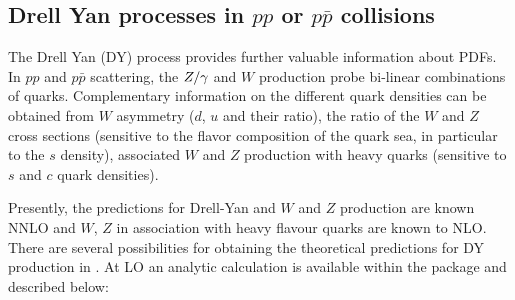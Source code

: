 \subsection{Drell Yan processes  in $pp$ or $p\bar p$ collisions}
\label{dysection}

The Drell Yan (DY) process
provides further valuable information about PDFs.
In $pp$ and $p\bar p$ scattering, the $Z/\gamma\*$ and $W$ production 
probe bi-linear combinations of quarks. 
Complementary information on the different quark densities
can be obtained from $W$ asymmetry ($d$, $u$ and their ratio),
the ratio of the $W$ and $Z$ cross sections (sensitive to the flavor 
composition of the quark sea, in particular to the $s$ density), 
associated $W$ and $Z$ production with
heavy quarks (sensitive to $s$ and $c$ quark densities).
%

Presently, the predictions for Drell-Yan and $W$ and $Z$ production are known 
NNLO and $W$, $Z$ in association with heavy flavour quarks are known to NLO. There are several possibilities 
for obtaining the theoretical
predictions for DY production in \fitter. 
At LO an analytic calculation is available within the package and described
below: 

